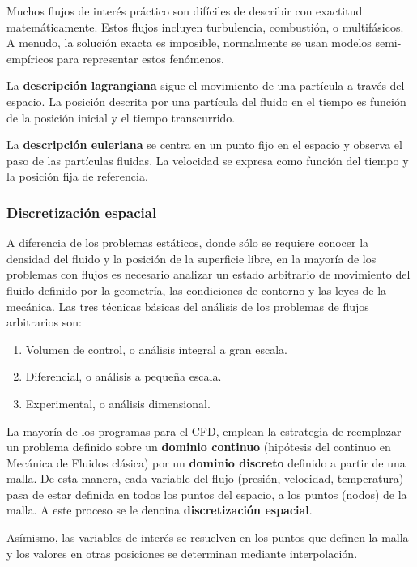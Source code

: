 Muchos flujos de interés práctico son difíciles de describir con
exactitud matemáticamente. Estos flujos incluyen turbulencia,
combustión, o multifásicos. A menudo, la solución exacta es imposible,
normalmente se usan modelos semi-empíricos para representar estos
fenómenos.

La \textbf{descripción lagrangiana} sigue el movimiento de una partícula
a través del espacio. La posición descrita por una partícula del fluido
en el tiempo es función de la posición inicial y el tiempo transcurrido.

La \textbf{descripción euleriana} se centra en un punto fijo en el
espacio y observa el paso de las partículas fluidas. La velocidad se
expresa como función del tiempo y la posición fija de referencia.

\subsubsection{Discretización espacial}\label{header-n143}

A diferencia de los problemas estáticos, donde sólo se requiere conocer
la densidad del fluido y la posición de la superficie libre, en la
mayoría de los problemas con flujos es necesario analizar un estado
arbitrario de movimiento del fluido definido por la geometría, las
condiciones de contorno y las leyes de la mecánica. Las tres técnicas
básicas del análisis de los problemas de flujos arbitrarios son:

\begin{enumerate}
\def\labelenumi{\arabic{enumi}.}
\item
  Volumen de control, o análisis integral a gran escala.
\item
  Diferencial, o análisis a pequeña escala.
\item
  Experimental, o análisis dimensional.
\end{enumerate}

La mayoría de los programas para el CFD, emplean la estrategia de
reemplazar un problema definido sobre un \textbf{dominio continuo}
(hipótesis del continuo en Mecánica de Fluidos clásica) por un
\textbf{dominio discreto} definido a partir de una malla. De esta
manera, cada variable del flujo (presión, velocidad, temperatura) pasa
de estar definida en todos los puntos del espacio, a los puntos (nodos)
de la malla. A este proceso se le denoina \textbf{discretización
espacial}.

Asímismo, las variables de interés se resuelven en los puntos que
definen la malla y los valores en otras posiciones se determinan
mediante interpolación.

